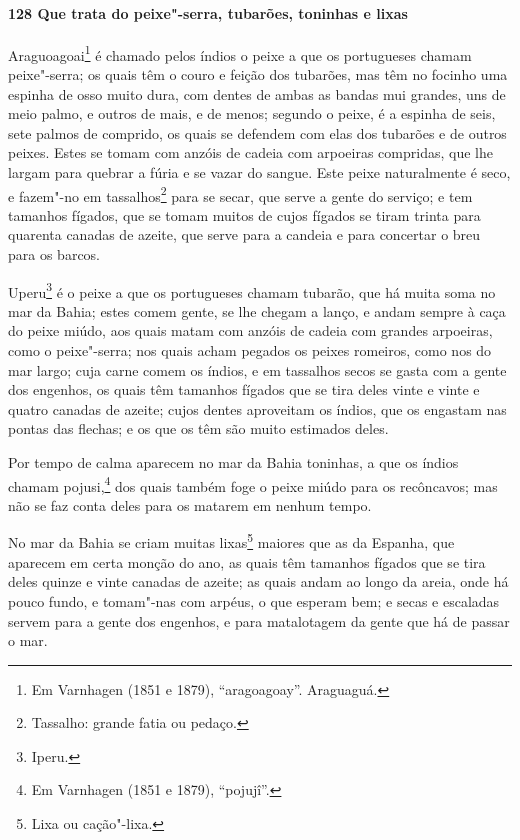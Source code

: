 \paragraph{128 Que trata do peixe"-serra, tubarões, toninhas e lixas}

Araguoagoai\footnote{ Em Varnhagen (1851 e 1879), ``aragoagoay''. Araguaguá.} é chamado
pelos índios o peixe a que os portugueses chamam peixe"-serra; os quais têm o couro e
feição dos tubarões, mas têm no focinho uma espinha de osso muito dura, com dentes de
ambas as bandas mui grandes, uns de meio palmo, e outros de mais, e de menos; segundo o
peixe, é a espinha de seis, sete palmos de comprido, os quais se defendem com elas dos
tubarões e de outros peixes. Estes se tomam com anzóis de cadeia com arpoeiras compridas,
que lhe largam para quebrar a fúria e se vazar do sangue. Este peixe naturalmente é seco,
e fazem"-no em tassalhos\footnote{ Tassalho: grande fatia ou pedaço.} para se secar, que
serve a gente do serviço; e tem tamanhos fígados, que se tomam muitos de cujos
fígados se tiram trinta para quarenta canadas de azeite, que serve para a candeia e para
concertar o breu para os barcos.

Uperu\footnote{ Iperu.} é o peixe a que os portugueses chamam tubarão, que há muita soma
no mar da Bahia; estes comem gente, se lhe chegam a lanço, e andam sempre à caça do peixe
miúdo, aos quais matam com anzóis de cadeia com grandes arpoeiras, como o peixe"-serra; nos
quais acham pegados os peixes romeiros, como nos do mar largo; cuja carne comem os índios,
e em tassalhos secos se gasta com a gente dos engenhos, os quais têm tamanhos fígados que
se tira deles vinte e vinte e quatro canadas de azeite; cujos dentes aproveitam os índios,
que os engastam nas pontas das flechas; e os que os têm são muito estimados deles.

Por tempo de calma aparecem no mar da Bahia toninhas, a que os índios chamam
pojusi,\footnote{ Em Varnhagen (1851 e 1879), ``pojujî''.} dos quais também foge o peixe
miúdo para os recôncavos; mas não se faz conta deles para os matarem em nenhum tempo.

No mar da Bahia se criam muitas lixas\footnote{ Lixa ou cação"-lixa.} maiores que as da
Espanha, que aparecem em certa monção do ano, as quais têm tamanhos fígados que se tira
deles quinze e vinte canadas de azeite; as quais andam ao longo da areia, onde há pouco
fundo, e tomam"-nas com arpéus, o que esperam bem; e secas e escaladas servem para a gente
dos engenhos, e para matalotagem da gente que há de passar o mar.

